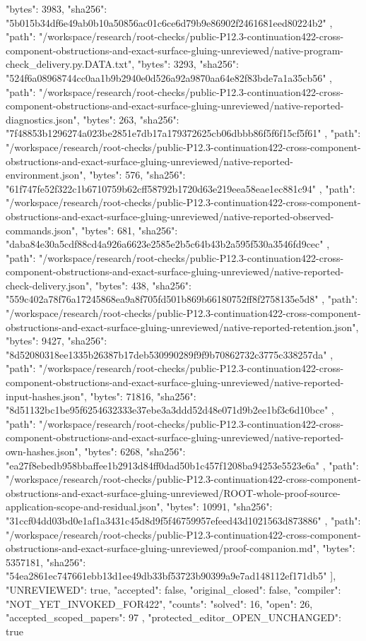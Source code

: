 \documentclass[11pt]{article}
\begin{document}
\begin{Full422Data}
{{      "bytes": 3983,
      "sha256": "5b015b34df6e49ab0b10a50856ac01c6ce6d79b9e86902f2461681eed80224b2"
    },
    {
      "path": "/workspace/research/root-checks/public-P12.3-continuation422-cross-component-obstructions-and-exact-surface-gluing-unreviewed/native-program-check_delivery.py.DATA.txt",
      "bytes": 3293,
      "sha256": "524f6a08968744cc0aa1b9b2940e0d526a92a9870aa64e82f83bde7a1a35cb56"
    },
    {
      "path": "/workspace/research/root-checks/public-P12.3-continuation422-cross-component-obstructions-and-exact-surface-gluing-unreviewed/native-reported-diagnostics.json",
      "bytes": 263,
      "sha256": "7f48853b1296274a023be2851e7db17a179372625cb06dbbb86f5f6f15cf5f61"
    },
    {
      "path": "/workspace/research/root-checks/public-P12.3-continuation422-cross-component-obstructions-and-exact-surface-gluing-unreviewed/native-reported-environment.json",
      "bytes": 576,
      "sha256": "61f747fe52f322c1b6710759b62cff58792b1720d63e219eea58eae1ec881c94"
    },
    {
      "path": "/workspace/research/root-checks/public-P12.3-continuation422-cross-component-obstructions-and-exact-surface-gluing-unreviewed/native-reported-observed-commands.json",
      "bytes": 681,
      "sha256": "daba84e30a5cdf88cd4a926a6623e2585e2b5c64b43b2a595f530a3546fd9cec"
    },
    {
      "path": "/workspace/research/root-checks/public-P12.3-continuation422-cross-component-obstructions-and-exact-surface-gluing-unreviewed/native-reported-check-delivery.json",
      "bytes": 438,
      "sha256": "559c402a78f76a17245868ea9a8f705fd501b869b66180752ff8f2758135e5d8"
    },
    {
      "path": "/workspace/research/root-checks/public-P12.3-continuation422-cross-component-obstructions-and-exact-surface-gluing-unreviewed/native-reported-retention.json",
      "bytes": 9427,
      "sha256": "8d52080318ee1335b26387b17deb530990289f9f9b70862732c3775c338257da"
    },
    {
      "path": "/workspace/research/root-checks/public-P12.3-continuation422-cross-component-obstructions-and-exact-surface-gluing-unreviewed/native-reported-input-hashes.json",
      "bytes": 71816,
      "sha256": "8d51132bc1be95f6254632333e37ebe3a3ddd52d48e071d9b2ee1bf3c6d10bce"
    },
    {
      "path": "/workspace/research/root-checks/public-P12.3-continuation422-cross-component-obstructions-and-exact-surface-gluing-unreviewed/native-reported-own-hashes.json",
      "bytes": 6268,
      "sha256": "ea27f8ebedb958bbaffee1b2913d84ff0dad50b1c457f1208ba94253e5523e6a"
    },
    {
      "path": "/workspace/research/root-checks/public-P12.3-continuation422-cross-component-obstructions-and-exact-surface-gluing-unreviewed/ROOT-whole-proof-source-application-scope-and-residual.json",
      "bytes": 10991,
      "sha256": "31ccf04dd03bd0e1af1a3431c45d8d9f5f46759957efeed43d1021563d873886"
    },
    {
      "path": "/workspace/research/root-checks/public-P12.3-continuation422-cross-component-obstructions-and-exact-surface-gluing-unreviewed/proof-companion.md",
      "bytes": 5357181,
      "sha256": "54ea2861ec747661ebb13d1ee49db33bf53723b90399a9e7ad148112ef171db5"
    }
  ],
  "UNREVIEWED": true,
  "accepted": false,
  "original_closed": false,
  "compiler": "NOT_YET_INVOKED_FOR422",
  "counts": {
    "solved": 16,
    "open": 26,
    "accepted_scoped_papers": 97
  },
  "protected_editor_OPEN_UNCHANGED": true
}


\end{Full422Data}
\end{document}
